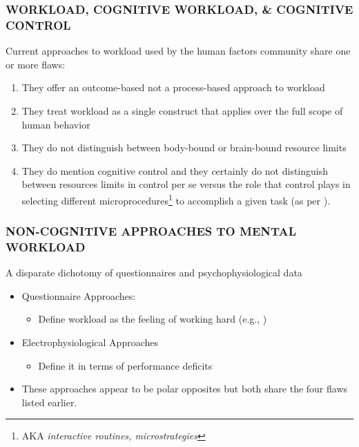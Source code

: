 \documentclass{beamer}
\begin{document}
\begin{frame}[label=4flaws]
	\frametitle{WORKLOAD, COGNITIVE WORKLOAD, \& COGNITIVE CONTROL}
	Current approaches to workload used by the human factors community share one or more flaws:
	\begin{enumerate}
		\item They offer an outcome-based not a process-based approach to workload
		\item They treat workload as a single construct that applies over the full scope of human behavior
		\item They do not distinguish between body-bound or brain-bound resource limits
		\item They do mention cognitive control and they certainly do not distinguish between resources limits in control per se versus the role that control plays in selecting different \alert{microprocedures}\footnote[frame]{AKA \emph{interactive routines, microstrategies}} to accomplish a given task (as per ).
	\end{enumerate}
	\vspace{.7cm}
\end{frame}

\begin{frame}
	\frametitle{NON-COGNITIVE APPROACHES TO MENTAL WORKLOAD}
	A disparate dichotomy of questionnaires and psychophysiological data					\begin{itemize} 
		\item Questionnaire Approaches:
		\begin{itemize}
			\item Define workload as the feeling of working hard (e.g., )
		\end{itemize}
		\item Electrophysiological Approaches
		\begin{itemize}
			\item Define it in terms of performance deficits
		\end{itemize}
		\item These approaches appear to be polar opposites but both share the four flaws listed earlier.
	\end{itemize}
\end{frame}
\end{document}

